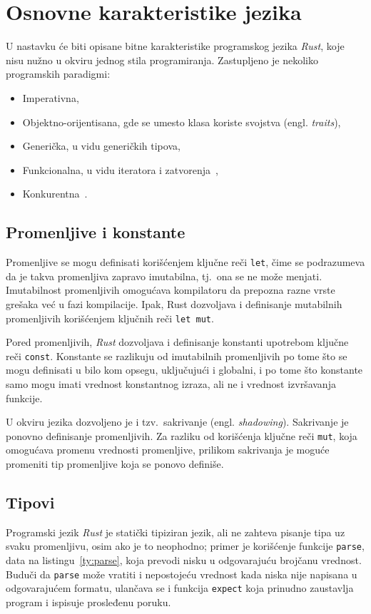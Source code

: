 \documentclass[12pt,oneside]{memoir}
\begin{document}
\section{Osnovne karakteristike jezika}
U nastavku će biti opisane bitne karakteristike programskog jezika \emph{Rust}, koje nisu nužno
u okviru jednog stila programiranja. Zastupljeno je nekoliko programskih paradigmi:

\begin{itemize}
    \item Imperativna,
    \item Objektno-orijentisana, gde se umesto klasa koriste svojstva (engl. \emph{traits}),
    \item Generička, u vidu generičkih tipova,
    \item Funkcionalna, u vidu iteratora i zatvorenja~\cite{functional_rust},
    \item Konkurentna~\cite{concurrent_rust}.
\end{itemize}

\subsection{Promenljive i konstante}
Promenljive se mogu definisati korišćenjem ključne reči \texttt{let}, čime se podrazumeva da
je takva promenljiva zapravo imutabilna, tj.\ ona se ne može menjati. Imutabilnost
promenljivih omogućava kompilatoru da prepozna razne vrste grešaka već u fazi kompilacije.
Ipak, Rust dozvoljava i definisanje mutabilnih promenljivih korišćenjem ključnih reči \texttt{let mut}.

Pored promenljivih, \emph{Rust} dozvoljava i definisanje konstanti
upotrebom ključne reči \texttt{const}.
Konstante se razlikuju od imutabilnih promenljivih po tome što se
mogu definisati u bilo kom opsegu, uključujući i globalni, i po
tome što konstante samo mogu imati vrednost konstantnog izraza,
ali ne i vrednost izvršavanja funkcije.

U okviru jezika dozvoljeno je i tzv.\ sakrivanje (engl. \emph{shadowing}).
Sakrivanje je ponovno definisanje promenljivih. Za razliku od
korišćenja ključne reči \texttt{mut}, koja omogućava promenu vrednosti promenljive, prilikom sakrivanja je
moguće promeniti tip promenljive koja se ponovo definiše.

\subsection{Tipovi}
Programski jezik \emph{Rust} je statički tipiziran jezik, ali
ne zahteva pisanje tipa uz svaku promenljivu, osim ako je to
neophodno; primer je korišćenje funkcije \texttt{parse}, data na listingu~\ref{ty:parse},
koja prevodi nisku u odgovarajuću brojčanu vrednost. Buduči da
\texttt{parse} može vratiti i nepostojeću vrednost kada niska nije napisana
u odgovarajućem formatu, ulančava se i funkcija \texttt{expect} koja
prinudno zaustavlja program i ispisuje prosleđenu poruku.
\end{document}
